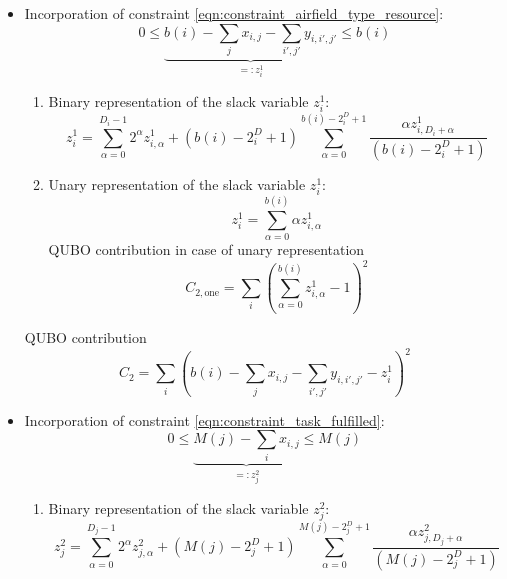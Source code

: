 \documentclass{article}
\begin{document}
\begin{itemize}
\item Incorporation of constraint \eqref{eqn:constraint_airfield_type_resource}:
    \begin{equation*}
        0 \leq \underbrace{b(i) - \sum_j x_{i,j} - \sum_{i', j'} y_{i, i', j'}}_{=:z^1_i} \leq b(i)
    \end{equation*}
    \begin{enumerate}
        \item 
        Binary representation of the slack variable $z^1_i$:
        \begin{equation*}
            z^1_{i} = \sum_{\alpha = 0}^{D_i - 1} 2^\alpha z^1_{i, \alpha} + (b(i) - 2^D_i + 1) \sum_{\alpha=0}^{b(i) - 2^D_i + 1} \frac{\alpha z^1_{i,  D_i + \alpha}}{(b(i) - 2^D_i + 1)} 
        \end{equation*}
        \item 
        Unary representation of the slack variable $z^1_i$:
        \begin{equation*}
            z^1_{i} = \sum_{\alpha = 0}^{b(i)} \alpha z^1_{i, \alpha}
        \end{equation*}
        QUBO contribution in case of unary representation
        \begin{equation*}
            C_{2, \text{one}} = \sum_{i} \left( \sum_{\alpha = 0}^{b(i)} z^1_{i, \alpha} - 1 \right)^2
        \end{equation*}
    \end{enumerate}
    QUBO contribution
    \begin{equation*}
        C_2 = \sum_i \left( b(i) - \sum_j x_{i,j} - \sum_{i', j'} y_{i, i', j'} - z^1_i \right)^2
    \end{equation*}
\item Incorporation of constraint \eqref{eqn:constraint_task_fulfilled}:
    \begin{equation*}
        0 \leq \underbrace{M(j) - \sum_i x_{i,j}}_{=:z^2_j} \leq M(j)
    \end{equation*}
    \begin{enumerate}
        \item 
        Binary representation of the slack variable $z^2_j$:
        \begin{equation*}
            z^2_{j} = \sum_{\alpha = 0}^{D_j - 1} 2^\alpha z^2_{j, \alpha} + (M(j) - 2^D_j + 1) \sum_{\alpha=0}^{M(j) - 2^D_j + 1} \frac{\alpha z^2_{j,  D_j + \alpha}}{(M(j) - 2^D_j + 1)} 
        \end{equation*}

\end{enumerate}
\end{itemize}
\end{document}
